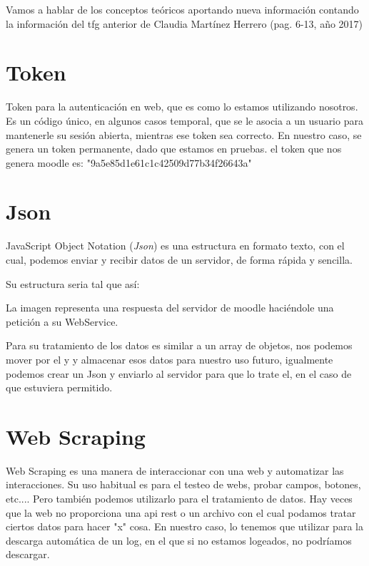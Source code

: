 
Vamos a hablar de los conceptos teóricos aportando nueva información contando la información del tfg anterior de Claudia Martínez Herrero (pag. 6-13, año 2017) \cite{claudia}




\section{Token}\label{token}

Token para la autenticación en web, que es como lo estamos utilizando nosotros. Es un código único, en algunos casos temporal, que se le asocia a un usuario para mantenerle su sesión abierta, mientras ese token sea correcto. En nuestro caso, se genera un token permanente, dado que estamos en pruebas. el token que nos genera moodle es: "9a5e85d1e61c1c42509d77b34f26643a"

\section{Json}\label{json}

JavaScript Object Notation (\emph{Json}) es una estructura en formato texto, con el cual, podemos enviar y recibir datos de un servidor, de forma rápida y sencilla. 

Su estructura seria tal que así:


La imagen representa una respuesta del servidor de moodle haciéndole una petición a su WebService.

Para su tratamiento de los datos es similar a un array de objetos, nos podemos mover por el y y almacenar esos datos para nuestro uso futuro, igualmente podemos crear un Json y enviarlo al servidor para que lo trate el, en el caso de que estuviera permitido.

\section{Web Scraping}\label{web-scraping}

Web Scraping es una manera de interaccionar con una web y automatizar las interacciones. Su uso habitual es para  el testeo de webs, probar campos, botones, etc.... Pero también podemos utilizarlo para el tratamiento de datos. Hay veces que la web no proporciona una api rest o un archivo con el cual podamos tratar ciertos datos para hacer "x" cosa. En nuestro caso, lo tenemos que utilizar para la descarga automática de un log, en el que si no estamos logeados, no podríamos descargar.

